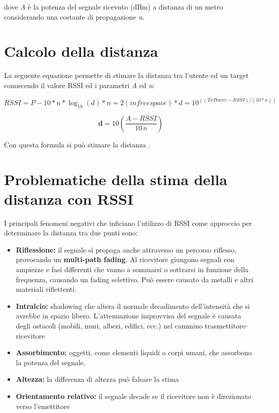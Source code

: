 dove \textit{A} è la potenza del segnale ricevuto (dBm) a distanza di un metro considerando una costante di propagazione \textit{n}.

\section{Calcolo della distanza}
La seguente equazione permette di stimare la distanza tra l'utente ed un target conoscendo il valore RSSI ed i parametri \textit{A} ed \textit{n}:

\begin{equation}\label{key}
RSSI = P - 10 * n * \log_10(d)
* n = 2 (in free space)
* d = 10 ^ ((TxPower - RSSI) / (10 * n))
\end{equation}

\begin{equation}
\textbf{d} = 10 \left( \frac{A − RSSI}{10\,n} \right)
\end{equation}

Con questa formula si può stimare la distanza .

\section{Problematiche della stima della distanza con RSSI}\label{ch:problematiche}
I principali fenomeni negativi che inficiano l'utilizzo di RSSI come approccio per determinare la distanza tra due punti sono:
\begin{itemize}
	\item \textbf{Riflessione:} il segnale si propaga anche attraverso un percorso riflesso, provocando un \textbf{multi-path fading}. Al ricevitore giungono segnali con ampiezze e fasi differenti che vanno a sommarsi o sottrarsi in funzione della frequenza, causando un fading selettivo. Può essere causato da metalli e altri materiali riflettenti.
	\item \textbf{Intralcio:} shadowing che altera il normale decadimento dell’intensità che si avrebbe in spazio libero. L’attenuazione improvvisa del segnale è causata degli ostacoli (mobili, muri, alberi, edifici, ecc.) nel cammino trasmettitore-ricevitore
	\item \textbf{Assorbimento:} oggetti, come elementi liquidi o corpi umani, che assorbono la potenza del segnale.
	\item \textbf{Altezza:} la differenza di altezza può falsare la stima
	\item \textbf{Orientamento relativo:} il segnale decade se il ricevitore non è direzionato verso l'emettitore
\end{itemize}

